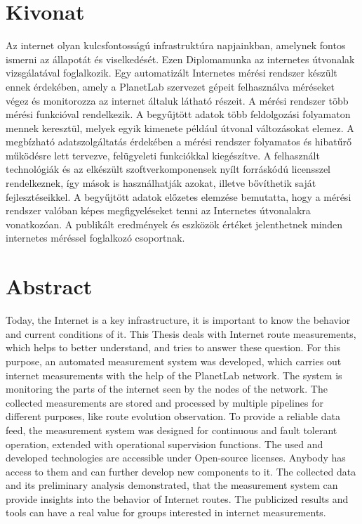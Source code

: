 \chapter*{Kivonat}

Az internet olyan kulcsfontosságú infrastruktúra napjainkban, amelynek fontos ismerni az állapotát és viselkedését. Ezen Diplomamunka az internetes útvonalak vizsgálatával foglalkozik.
Egy automatizált Internetes mérési rendszer készült ennek érdekében, amely a PlanetLab szervezet gépeit felhasználva méréseket végez és monitorozza az internet általuk látható részeit. A mérési rendszer több mérési funkcióval rendelkezik. A begyűjtött adatok több feldolgozási folyamaton mennek keresztül, melyek egyik kimenete például útvonal változásokat elemez. A megbízható adatszolgáltatás érdekében a mérési rendszer folyamatos és hibatűrő működésre lett tervezve, felügyeleti funkciókkal kiegészítve. A felhasznált technológiák és az elkészült szoftverkomponensek nyílt forráskódú licensszel rendelkeznek, így mások is használhatják azokat, illetve bővíthetik saját fejlesztéseikkel.
A begyűjtött adatok előzetes elemzése bemutatta, hogy a mérési rendszer valóban képes megfigyeléseket tenni az Internetes útvonalakra vonatkozóan. A publikált eredmények és eszközök értéket jelenthetnek minden internetes méréssel foglalkozó csoportnak.

\chapter*{Abstract}

Today, the Internet is a key infrastructure, it is important to know the behavior and current conditions of it. This Thesis deals with Internet route measurements, which helps to better understand, and tries to answer these question.
For this purpose, an automated measurement system was developed, which carries out internet measurements with the help of the PlanetLab network. The system is monitoring the parts of the internet seen by the nodes of the network. The collected measurements are stored and processed by multiple pipelines for different purposes, like route evolution observation. To provide a reliable data feed, the measurement system was designed for continuous and fault tolerant operation, extended with operational supervision functions. The used and developed technologies are accessible under Open-source licenses. Anybody has access to them and can further develop new components to it.
The collected data and its preliminary analysis demonstrated, that the measurement system can provide insights into the behavior of Internet routes. The publicized results and tools can have a real value for groups interested in internet measurements.


